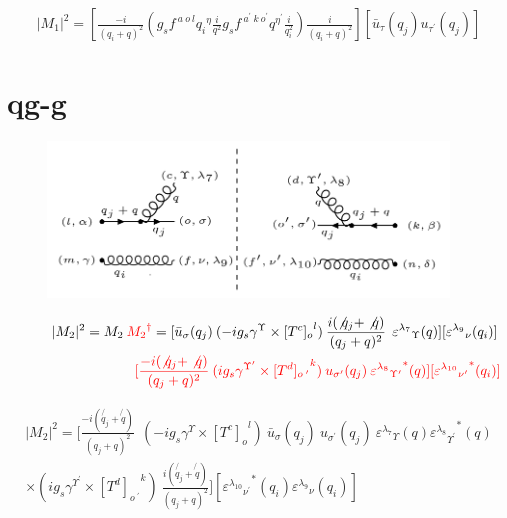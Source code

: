 \begin{equation}
\begin{split}
|M_1|^2=[ \frac{-i}{(q_i +q)^2}(g_s f^{\:a\:o\:l} {q_i}^{\eta} \frac{i}{q^2} g_s f^{\:a^{\prime}\:k\:o^{\prime}} {q}^{{\eta}^{\prime}}\frac{i}{q_i^2})\frac{i}{(q_i +q)^2}][\bar{u}_{\tau}(q_j){u}_{{\tau}^{\prime}}(q_j)]
\end{split}
\end{equation}




\pagebreak

\section{qg-g}
\begin{figure}[ht!]
\centering
\includegraphics[width=0.95\textwidth]{images/qggM2squer.png}
\end{figure}
\begin{equation}
\begin{split}
|M_2|^2=M_2\:{\color[RGB]{255,0,0} {M_2}^{\dagger}} = [{\bar{u}}_{\sigma}(q_j)\: (-ig_s \gamma^{\Upsilon}\times {[T^c]_o}^l) \: \frac{i(\not{q_j} + \not{q})}{(q_j + q)^2}\:\: {\varepsilon^{\lambda_7}}_{\Upsilon} (q)] [{\varepsilon^{\lambda_9}}_{\nu} (q_i)]\: \\
\quad\quad\quad\quad\quad\quad\quad\quad\:\:{\color[RGB]{255,0,0}[\frac{-i(\not{q_j} + \not{q})}{(q_j + q)^2} \:  (ig_s \gamma^{{\Upsilon}^{\prime}}\times {[T^d]_{o\:^{\prime}}}^k) \: u_{{\sigma}^{\prime}}(q_j) \: {{\varepsilon^{\lambda_8}}_{{\Upsilon}^{\prime}}}^* (q)][{{\varepsilon^{\lambda_{10}}}_{{\nu}^{\prime}}}^* (q_i)]}
\end{split}
\end{equation}

\begin{equation}
\begin{split}
|M_2|^2=[\frac{-i(\not{q_j} + \not{q})}{(q_j + q)^2} \:
 \:  (-ig_s \gamma^{\Upsilon}\times {[T^c]_o}^l) \: {\bar{u}}_{\sigma}(q_j)\:u_{{\sigma}^{\prime}}(q_j) \: {\varepsilon^{\lambda_7}}_{\Upsilon} (q) {{\varepsilon^{\lambda_8}}_{{\Upsilon}^{\prime}}}^* (q) \\
\times (ig_s \gamma^{{\Upsilon}^{\prime}}\times {[T^d]_{o\:^{\prime}}}^k) \: \frac{i(\not{q_j} + \not{q})}{(q_j + q)^2} ]
[{{\varepsilon^{\lambda_{10}}}_{{\nu}^{\prime}}}^* (q_i) {\varepsilon^{\lambda_9}}_{\nu} (q_i)]
\end{split}
\end{equation}

